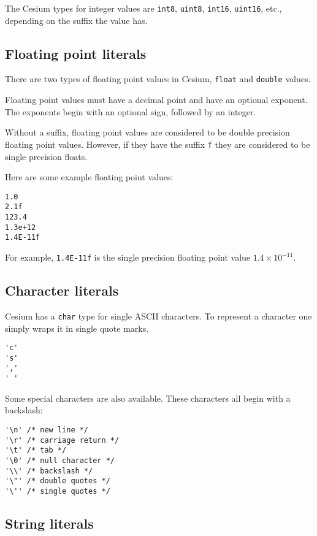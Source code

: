 \documentclass[a4paper,10pt]{article}
\newcommand{\code}{\lstinline}
\begin{document}
The Cesium types for integer values are \code{int8}, \code{uint8}, \code{int16}, 
\code{uint16}, etc., depending on the suffix the value has.

\subsection{Floating point literals}

There are two types of floating point values in Cesium, \code{float} and \code{double} values.

Floating point values must have a decimal point and have an optional exponent. The exponents 
begin with an optional sign, followed by an integer. 

Without a suffix, floating point values are considered to be double precision floating point 
values. However, if they have the suffix \code{f} they are considered to be single precision 
floats.

Here are some example floating point values:

\begin{lstlisting}
1.0
2.1f
123.4
1.3e+12
1.4E-11f
\end{lstlisting}

For example, \code{1.4E-11f} is the single precision floating point value $1.4\times 10^{-11}$.

\subsection{Character literals}

Cesium has a \code{char} type for single ASCII characters. To represent a character one simply
wraps it in single quote marks.

\begin{lstlisting}
'c'
's'
','
' '
\end{lstlisting}

Some special characters are also available. These characters all begin with a backslash:

\begin{lstlisting}
'\n' /* new line */
'\r' /* carriage return */
'\t' /* tab */
'\0' /* null character */
'\\' /* backslash */
'\"' /* double quotes */
'\'' /* single quotes */
\end{lstlisting}

\subsection{String literals}
\end{document}
